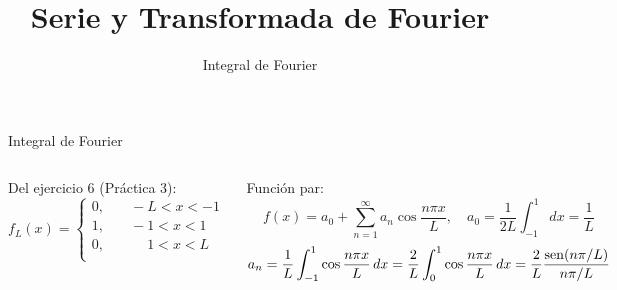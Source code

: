 \documentclass[9pt, aspectratio=169]{beamer}
\title{Serie y Transformada de Fourier}
\subtitle{Integral de Fourier}
\begin{document}
\maketitle

\begin{frame}{Integral de Fourier}
\begin{columns}[t]
Del ejercicio 6 (Práctica 3):
\begin{equation*}
f_L(x) =
\begin{cases}
    0,& \quad -L < x < -1 \\
    1,& \quad -1 < x < 1 \\
    0,& \quad \phantom{-}1 < x < L \\
\end{cases}
\end{equation*}
\pause

Función par:
\[ f(x) = a_0 + \sum_{n = 1}^{\infty} a_n \cos \frac{n \pi x}{L}, \quad a_0 = \frac{1}{2L} \int_{-1}^{1} dx = \frac{1}{L} \]
\[ a_n = \frac{1}{L} \int_{-1}^{1} \cos\frac{n \pi x}{L} \, dx = \frac{2}{L} \int_{0}^{1} \cos\frac{n \pi x}{L} \, dx = \frac{2}{L} \frac{\operatorname{sen}(n \pi / L)}{n \pi / L} \]
\end{columns}
\pause


\end{frame}
\end{document}
